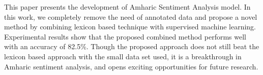 This paper presents the development of Amharic Sentiment Analysis model. In this work, we completely remove the need of annotated data and propose a novel method by combining lexicon based technique with supervised machine learning. Experimental results show that the proposed combined method performs well with an accuracy of 82.5\%. Though the proposed approach does not still beat the lexicon based approach with the small data set used, it is a breakthrough in Amharic sentiment analysis, and opens exciting opportunities for future research.
